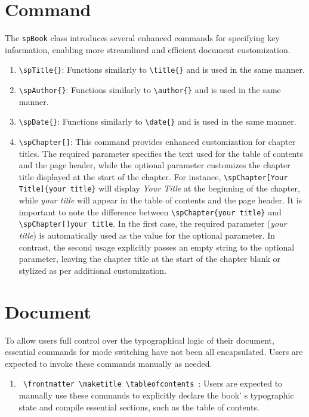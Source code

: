 \section{Command}
    The \texttt{spBook} class introduces several enhanced commands for specifying key information, enabling more streamlined and efficient document customization.
    \begin{enumerate}
        \item \texttt{\textbackslash spTitle\{\}}: Functions similarly to \texttt{\textbackslash title\{\}} and is used in the same manner.
        \item \texttt{\textbackslash spAuthor\{\}}: Functions similarly to \texttt{\textbackslash author\{\}} and is used in the same manner.
        \item \texttt{\textbackslash spDate\{\}}: Functions similarly to \texttt{\textbackslash date\{\}} and is used in the same manner.
        \item \texttt{\textbackslash spChapter[]{}}: This command provides enhanced customization for chapter titles. The required parameter specifies the text used for the table of contents and the page header, while the optional parameter customizes the chapter title displayed at the start of the chapter. For instance, \texttt{\textbackslash spChapter[Your Title]\{your title\}} will display \emph{Your Title} at the beginning of the chapter, while \emph{your title} will appear in the table of contents and the page header. It is important to note the difference between \texttt{\textbackslash spChapter\{your title\}} and \texttt{\textbackslash spChapter[]{your title}}. In the first case, the required parameter (\emph{your title}) is automatically used as the value for the optional parameter. In contrast, the second usage explicitly passes an empty string to the optional parameter, leaving the chapter title at the start of the chapter blank or stylized as per additional customization.
    \end{enumerate}

\section{Document}
    To allow users full control over the typographical logic of their document, essential commands for mode switching have not been all encapsulated. Users are expected to invoke these commands manually as needed.

    \begin{enumerate}
        \item \texttt{%
            \textbackslash frontmatter
            \textbackslash maketitle
            \textbackslash tableofcontents
        }: Users are expected to manually use these commands to explicitly declare the book'
        s typographic state and compile essential sections, such as the table of contents.
    \end{enumerate}